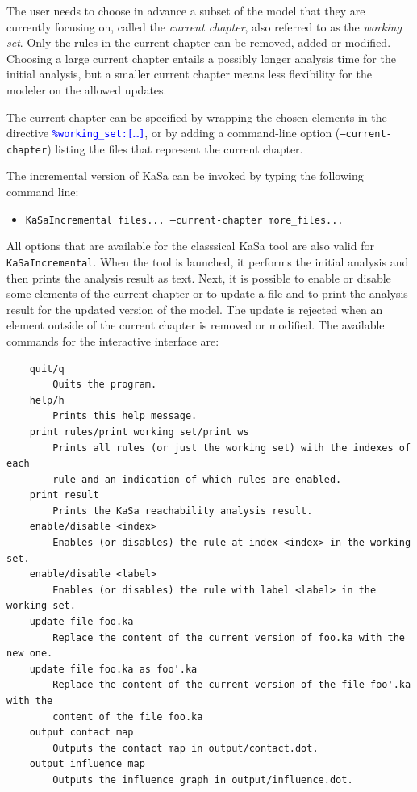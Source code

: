\documentclass[11pt]{book}
\def\KaSa{\textsf{KaSa}}
\def\tcb#1{\textcolor{blue}{\ttt{#1}}}
\def\ttt#1{\texttt{#1}}
\def\ITE#1{\begin{itemize}#1\end{itemize}}
\begin{document}
The user needs to choose in advance a subset of the model that they are currently focusing on, called the \emph{current chapter}, also referred to as the \emph{working set}. Only the rules in the current chapter can be removed, added or modified. Choosing a large current chapter entails a possibly longer analysis time for the initial analysis, but a smaller current chapter means less flexibility for the modeler on the allowed updates. 

The current chapter can be specified by wrapping the chosen elements in the directive \tcb{\%working\_set:[\dots]}, or by adding a command-line option (\texttt{---current-chapter}) listing the files that represent the current chapter.

The incremental version of \KaSa{} can be invoked by typing the following command line:

\ITE{
\item[\$] \ttt{KaSaIncremental files...  ---current-chapter more\_files...}
}

All options that are available for the classsical \KaSa{} tool are also valid for \ttt{KaSaIncremental}.
When the tool is launched, it performs the initial analysis and then prints the analysis result as text. Next, it is possible to enable or disable some elements of the current chapter or to update a file and to print the analysis result for the updated version of the model. The update is rejected when an element outside of the current chapter is removed or modified.
The available commands for the interactive interface are: 

\begin{verbatim}
    quit/q
        Quits the program.
    help/h
        Prints this help message.
    print rules/print working set/print ws
        Prints all rules (or just the working set) with the indexes of each 
        rule and an indication of which rules are enabled.
    print result
        Prints the KaSa reachability analysis result.
    enable/disable <index>
        Enables (or disables) the rule at index <index> in the working set.
    enable/disable <label>
        Enables (or disables) the rule with label <label> in the working set.
    update file foo.ka
        Replace the content of the current version of foo.ka with the new one.
    update file foo.ka as foo'.ka
        Replace the content of the current version of the file foo'.ka with the 
        content of the file foo.ka
    output contact map
        Outputs the contact map in output/contact.dot.
    output influence map
        Outputs the influence graph in output/influence.dot.
\end{verbatim}
\end{document}
